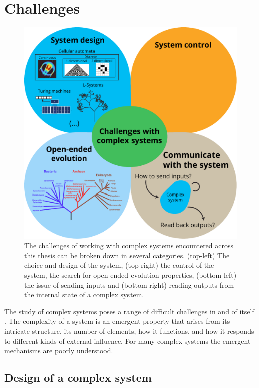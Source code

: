 \section{Challenges}

\begin{figure}[htbp]
  \centering
  \includegraphics[width=.9\linewidth]{figures/challenges}
  \caption{The challenges of working with complex systems encountered across
    this thesis can be broken down in several categories. (top-left) The choice
    and design of the system, (top-right) the control of the system, the search
    for open-ended evolution properties, (bottom-left) the issue of sending
    inputs and (bottom-right) reading outputs from the internal state of a
    complex system.}
  \label{fig:challenges}
\end{figure}

The study of complex systems poses a range of difficult challenges in and of
itself \cite{sanmiguelChallengesComplexSystems2012}. The complexity of a system
is an emergent property that arises from its intricate structure, its number of
elements, how it functions, and how it responds to different kinds of external
influence. For many complex systems the emergent mechanisms are poorly
understood.


\subsection{Design of a complex system}

